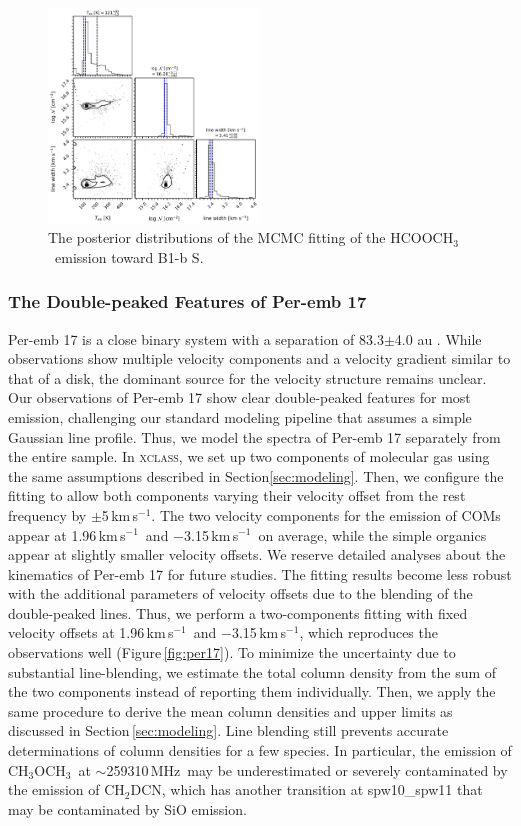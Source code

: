 \documentclass[twocolumn]{aastex62}
\newcommand{\kms}{\mbox{\,km\,s$^{-1}$}}
\newcommand{\mhz}{\mbox{\,MHz}}
\newcommand{\methylformate}{\mbox{HCOOCH$_{3}$}}
\newcommand{\dimethylether}{\mbox{CH$_{3}$OCH$_{3}$}}
\newcommand{\dmethylcyanide}{\mbox{CH$_{2}$DCN}}
\begin{document}


\begin{figure}[htbp!]
  \centering
  \includegraphics[width=0.5\textwidth]{Set3_ID00_ch3ocho_corner.pdf}
  \caption{The posterior distributions of the MCMC fitting of the \methylformate\ emission toward B1-b S.}
  \label{fig:corner_mf}
\end{figure}

\subsubsection{The Double-peaked Features of Per-emb 17}
\label{sec:per17}
Per-emb 17 is a close binary system with a separation of 83.3$\pm$4.0 au \citep{2018ApJ...867...43T}.  While observations show multiple velocity components and a velocity gradient similar to that of a disk, the dominant source for the velocity structure remains unclear.  Our observations of Per-emb 17 show clear double-peaked features for most emission, challenging our standard modeling pipeline that assumes a simple Gaussian line profile.  Thus, we model the spectra of Per-emb 17 separately from the entire sample.  In \textsc{xclass}, we set up two components of molecular gas using the same assumptions described in Section\ref{sec:modeling}.  Then, we configure the fitting to allow both components varying their velocity offset from the rest frequency by $\pm$5\kms.  The two velocity components for the emission of COMs appear at 1.96\kms\ and $-$3.15\kms\ on average, while the simple organics appear at slightly smaller velocity offsets.  We reserve detailed analyses about the kinematics of Per-emb 17 for future studies.  The fitting results become less robust with the additional parameters of velocity offsets due to the blending of the double-peaked lines.  Thus, we perform a two-components fitting with fixed velocity offsets at 1.96\kms\ and $-$3.15\kms, which reproduces the observations well (Figure\,\ref{fig:per17}).  To minimize the uncertainty due to substantial line-blending, we estimate the total column density from the sum of the two components instead of reporting them individually.  Then, we apply the same procedure to derive the mean column densities and upper limits as discussed in Section\,\ref{sec:modeling}.  Line blending still prevents accurate determinations of column densities for a few species.  In particular, the emission of \dimethylether\ at $\sim$259310\mhz\ may be underestimated or severely contaminated by the emission of \dmethylcyanide, which has another transition at spw10\_spw11 that may be contaminated by SiO emission.
\end{document}

